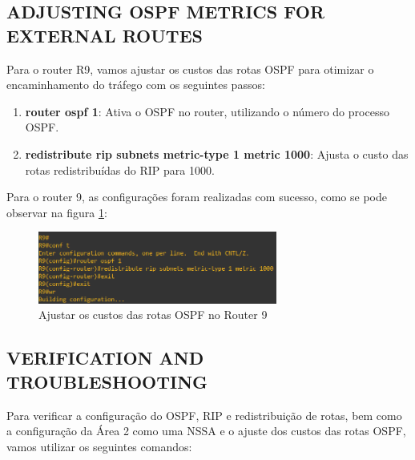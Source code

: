 \documentclass[11pt,english, openright, oneside]{book}
\begin{document}
\newpage
\subsection{ADJUSTING OSPF METRICS FOR EXTERNAL ROUTES}
\vspace{0.2cm}

Para o router R9, vamos ajustar os custos das rotas OSPF para otimizar o encaminhamento do tráfego com os seguintes passos:
\vspace{0.2cm}

\begin{enumerate}
  \item \textbf{router ospf 1}: Ativa o OSPF no router, utilizando o número do processo OSPF.
  \item \textbf{redistribute rip subnets metric-type 1 metric 1000}: Ajusta o custo das rotas redistribuídas do RIP para 1000.
\end{enumerate}
\vspace{0.2cm}

Para o router 9, as configurações foram realizadas com sucesso, como se pode observar na figura \ref{fig:config34}:
\vspace{0.2cm}

\begin{figure}[H]
  \centering
  \includegraphics[width=0.7\textwidth]{imagens/Tarefa4/21.adjust_R9.png}
  \caption{Ajustar os custos das rotas OSPF no Router 9}
  \label{fig:config34}
\end{figure}
\vspace{0.2cm}

\subsection{VERIFICATION AND TROUBLESHOOTING}
\vspace{0.2cm}

Para verificar a configuração do OSPF, RIP e redistribuição de rotas, bem como a configuração da Área 2 como uma NSSA e o ajuste dos custos das rotas OSPF, vamos utilizar os seguintes comandos:
\vspace{0.2cm}
\end{document}
